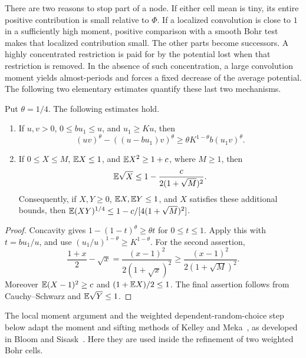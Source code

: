 There are two reasons to stop part of a node. If either cell mean is
tiny, its entire positive contribution is small relative to $\Phi$.
If a localized convolution is close to $1$ in a sufficiently high
moment, positive comparison with a smooth Bohr test makes that
localized contribution small. The other parts become successors.
A highly concentrated restriction is paid for by the potential lost
when that restriction is removed. In the absence of such concentration,
a large convolution moment yields almost-periods and forces a fixed
decrease of the average potential. The following two elementary
estimates quantify these last two mechanisms.

\begin{lemma}\label{shift:potential}
Put $\theta=1/4$.  The following estimates hold.
\begin{enumerate}
\item If $u,v>0$, $0\leq bu_1\leq u$, and $u_1\geq Ku$, then
\begin{equation}\label{shift:peeling}
 (uv)^\theta-((u-bu_1)v)^\theta
 \geq \theta K^{1-\theta}b(u_1v)^\theta.
\end{equation}
\item If $0\leq X\leq M$, $\mathbb E X\leq1$, and
$\mathbb E X^2\geq1+c$, where $M\geq1$, then
\begin{equation}\label{shift:concavity}
 \mathbb E\sqrt X\leq1-\frac{c}{2(1+\sqrt M)^2}.
\end{equation}
Consequently, if $X,Y\geq0$, $\mathbb E X,\mathbb E Y\leq1$, and $X$ satisfies
these additional bounds, then
$\mathbb E(XY)^{1/4}\leq1-c/[4(1+\sqrt M)^2]$.
\end{enumerate}
\end{lemma}
\begin{proof}
Concavity gives $1-(1-t)^\theta\geq\theta t$ for $0\leq t\leq1$.
Apply this with $t=bu_1/u$, and use
$(u_1/u)^{1-\theta}\geq K^{1-\theta}$.
For the second assertion,
\[
 \frac{1+x}{2}-\sqrt{x}
 =\frac{(x-1)^2}{2(1+\sqrt{x})^2}
 \geq\frac{(x-1)^2}{2(1+\sqrt M)^2}.
\]
Moreover $\mathbb E(X-1)^2\geq c$ and $(1+\mathbb E X)/2\leq1$.
The final assertion follows from Cauchy--Schwarz and
$\mathbb E\sqrt Y\leq1$.
\end{proof}

The local moment argument and the weighted dependent-random-choice
step below adapt the moment and sifting methods of Kelley and
Meka~\cite[Sections~4--5]{KelleyMeka2023}, as developed in
Bloom and Sisask~\cite[Sections~2.1--2.2]{BloomSisaskKelleyMeka}.
Here they are used inside the refinement of two weighted Bohr cells.

